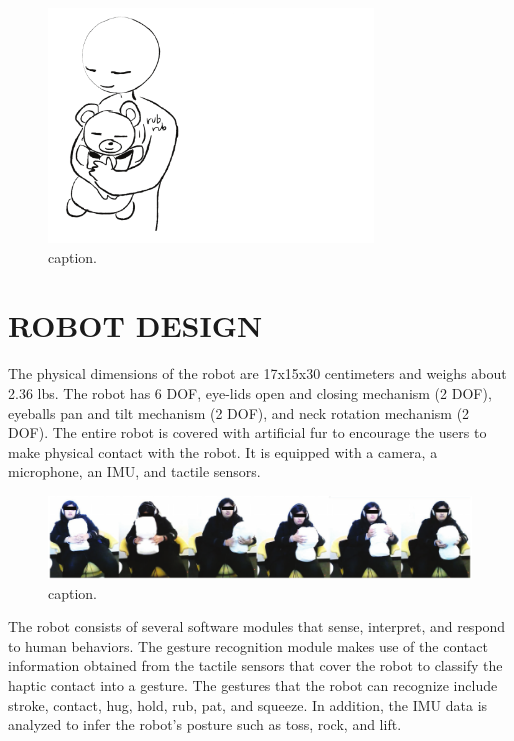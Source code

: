 \documentclass[letterpaper, 10 pt, conference]{ieeeconf}  %
\begin{document}
\begin{figure}[t!]
\centering
\includegraphics[width=3.4in]{teaser.pdf}
\vskip -10pt
\caption{caption.}
\label{fig:teaser}
\end{figure}

\section{ROBOT DESIGN}
The physical dimensions of the robot are 17x15x30 centimeters and weighs about 2.36 lbs. The robot has 6 DOF, eye-lids open and closing mechanism (2 DOF), eyeballs pan and tilt mechanism (2 DOF), and neck rotation mechanism (2 DOF). The entire robot is covered with artificial fur to encourage the users to make physical contact with the robot. It is equipped with a camera, a microphone, an IMU, and tactile sensors.  

\begin{figure}[t!]
\centering
\includegraphics[width=\textwidth]{pilot-data.pdf}
\vskip -10pt
\caption{caption.}
\label{fig:pilot-study}
\end{figure}

The robot consists of several software modules that sense, interpret, and respond to human behaviors. The gesture recognition module makes use of the contact information obtained from the tactile sensors that cover the robot to classify the haptic contact into a gesture. The gestures that the robot can recognize include stroke, contact, hug, hold, rub, pat, and squeeze. In addition, the IMU data is analyzed to infer the robot's posture such as toss, rock, and lift.  
\end{document}
